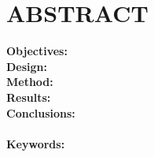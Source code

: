 \section*{ABSTRACT}
\textbf{Objectives:}\\
\textbf{Design:}\\
\textbf{Method:}\\
\textbf{Results:}\\
\textbf{Conclusions:}\\\\
\textbf{Keywords: } 